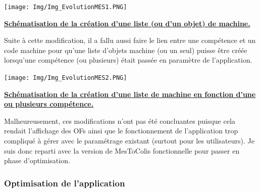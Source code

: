 \documentclass[a4paper,12pt]{extarticle}
\newcommand{\espace}{\vspace{0.3cm}}
\begin{document}
\centerline{\texttt{[image: Img/Img\_EvolutionMES1.PNG]}}
\centerline{\textbf{\underline{Schématisation de la création d’une liste (ou d’un objet) de machine.}}}
\espace{}

Suite à cette modification, il a fallu aussi faire le lien entre une compétence et un code machine pour qu’une liste d’objets machine (ou un seul) puisse être créée lorsqu’une compétence (ou plusieurs) était passée en paramètre de l’application.\\

\centerline{\texttt{[image: Img/Img\_EvolutionMES2.PNG]}}
\centerline{\textbf{\underline{Schématisation de la création d’une liste de machine en fonction d’une ou plusieurs compétence.}}}
\espace{}

Malheureusement, ces modifications n’ont pas été concluantes puisque cela rendait l’affichage des OFs ainsi que le fonctionnement de l’application trop compliqué à gérer avec le paramétrage existant (surtout pour les utilisateurs). Je suis donc reparti avec la version de MesToColis fonctionnelle pour passer en phase d’optimisation.
	
	\subsubsection{Optimisation de l’application}
		\paragraph{}
	
\end{document}
